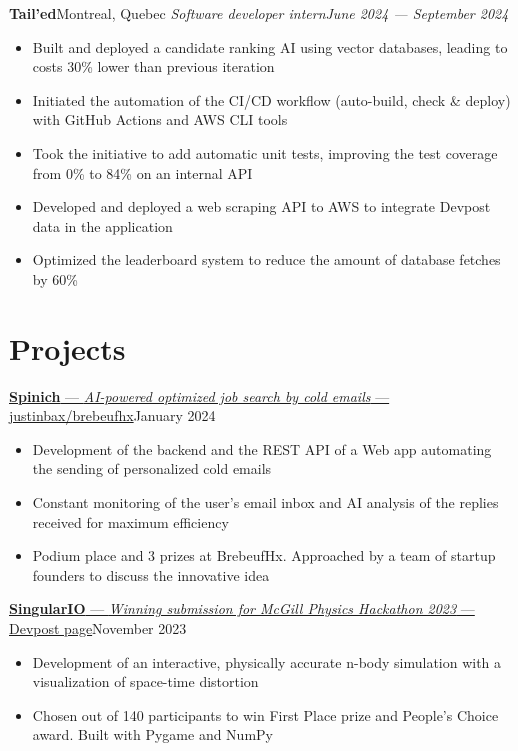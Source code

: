 \documentclass{article}
\newcommand{\newrole}[4]{
    {\normalfont\textbf{#1}\hfill#3}
    \newline
    \textit{#2}\hfill\textit{#4}
}
\newcommand{\shortlinkrole}[5]{
    {\href{#3}{\normalfont\textbf{#1} --- \textit{#2} --- #4\:\faExternalLink}\hfill#5\vspace*{-4pt}}
}
\newenvironment{bulletpoints}{\begin{itemize}\setlength\itemsep{-0.2em}}{\end{itemize}}
\begin{document}
\newrole{Tail'ed}{Software developer intern}{Montreal, Quebec}{June 2024 --- September 2024}
\begin{bulletpoints}
    \item Built and deployed a candidate ranking AI using vector databases, leading to costs 30\% lower than previous iteration
    \item Initiated the automation of the CI/CD workflow (auto-build, check \& deploy) with GitHub Actions and AWS CLI tools
    \item Took the initiative to add automatic unit tests, improving the test coverage from 0\% to 84\% on an internal API
    \item Developed and deployed a web scraping API to AWS to integrate Devpost data in the application
    \item Optimized the leaderboard system to reduce the amount of database fetches by 60\%
\end{bulletpoints}


\section*{Projects}

\shortlinkrole{Spinich}{AI-powered optimized job search by cold emails}{https://github.com/justinbax/brebeufhx}{justinbax/brebeufhx}{January 2024}
\begin{bulletpoints}
    \item Development of the backend and the REST API of a Web app automating the sending of personalized cold emails
    \item Constant monitoring of the user's email inbox and AI analysis of the replies received for maximum efficiency
    \item Podium place and 3 prizes at BrebeufHx. Approached by a team of startup founders to discuss the innovative idea
\end{bulletpoints}

\shortlinkrole{SingularIO}{Winning submission for McGill Physics Hackathon 2023}{https://devpost.com/software/singulario}{Devpost page}{November 2023}
\begin{bulletpoints}
    \item Development of an interactive, physically accurate n-body simulation with a visualization of space-time distortion
    \item Chosen out of 140 participants to win First Place prize and People's Choice award. Built with Pygame and NumPy
\end{bulletpoints}
\end{document}
